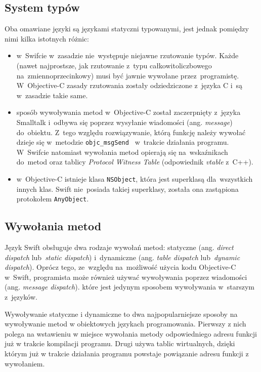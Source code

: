 \documentclass[mgr, shortabstract]{iithesis}
\newcommand{\ang}[1]{ang. \textit{#1}}
\begin{document}
\subsection{System typów}
\label{s:system_typow}

Oba omawiane języki są językami statyczni typowanymi, jest jednak pomiędzy nimi kilka istotnych różnic:

\begin{itemize}

    \item w~Swifcie w~zasadzie nie~występuje niejawne rzutowanie typów. Każde (nawet najprostsze, jak rzutowanie z~typu całkowitoliczbowego na~zmiennoprzecinkowy) musi być jawnie wywołane przez~programistę. W~Objective-C zasady rzutowania zostały odziedziczone z~języka C i~są w~zasadzie takie same.
    \item sposób wywoływania metod w~Objective-C został zaczerpnięty z~języka Smalltalk i~odbywa się poprzez wysyłanie wiadomości (\ang{message}) do~obiektu. Z~tego względu rozwiązywanie, którą funkcję należy wywołać dzieje się w~metodzie \texttt{objc_msgSend } w~trakcie działania programu. W~Swifcie natomiast wywołania metod opierają się na~wskaźnikach do~metod oraz tablicy \textit{Protocol Witness Table} (odpowiednik \textit{vtable} z~C++).
    \item w~Objective-C istnieje klasa \texttt{NSObject}, która jest superklasą dla~wszystkich innych klas. Swift nie~posiada takiej superklasy, została ona zastąpiona protokołem \texttt{AnyObject}.

\end{itemize}

\subsection{Wywołania metod}

Język Swift obsługuje dwa rodzaje wywołań metod: statyczne (\ang{direct dispatch} lub~\textit{static dispatch}) i~dynamiczne (\ang{table dispatch} lub~\textit{dynamic dispatch}). Oprócz tego, ze~względu na~możliwość użycia kodu Objective-C w~Swift, programista może również używać wywoływania poprzez wiadomości (\ang{message dispatch}). które jest jedynym sposobem wywoływania w~starszym z~języków.

Wywoływanie statyczne i dynamiczne to dwa najpopularniejsze sposoby na wywoływanie metod w obiektowych językach programowania. Pierwszy z nich polega na wstawieniu w miejsce wywołania metody odpowiedniego adresu funkcji już w trakcie kompilacji programu. Drugi używa tablic wirtualnych, dzięki którym już w trakcie działania programu powstaje powiązanie adresu funkcji z wywołaniem.
\end{document}
